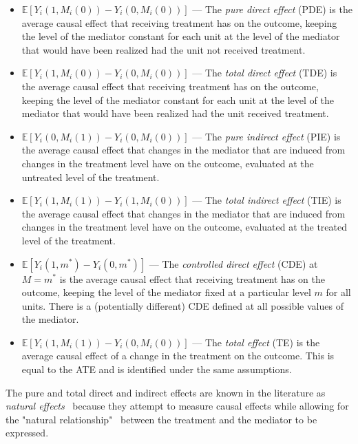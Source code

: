 \begin{itemize}[noitemsep,topsep=0pt]
	\item $\mathbb{E}[Y_{i}(1,M_{i}(0)) - Y_{i}(0,M_{i}(0))]$ --- The \textit{pure direct effect} (PDE)
	is the average causal effect that receiving treatment has on the outcome, keeping the level of the mediator constant 
	for each unit at the level of the mediator that would have been realized had the unit not received treatment. 
	\item $\mathbb{E}[Y_{i}(1,M_{i}(0)) - Y_{i}(0,M_{i}(0))]$ --- The \textit{total direct effect} (TDE)
	is the average causal effect that receiving treatment has on the outcome, keeping the level of the mediator constant 
	for each unit at the level of the mediator that would have been realized had the unit received treatment. 
	\item $\mathbb{E}[Y_{i}(0,M_{i}(1)) - Y_{i}(0,M_{i}(0))]$ --- The \textit{pure indirect effect} (PIE)
	is the average causal effect that changes in the mediator that are induced from changes in the treatment level have
	on the outcome, evaluated at the untreated level of the treatment.  
	\item $\mathbb{E}[Y_{i}(1,M_{i}(1)) - Y_{i}(1,M_{i}(0))]$ --- The \textit{total indirect effect} (TIE)
	is the average causal effect that changes in the mediator that are induced from changes in the treatment level have
	on the outcome, evaluated at the treated level of the treatment.  
	\item $\mathbb{E}[Y_{i}(1,m^{*}) - Y_{i}(0,m^{*})]$ --- The \textit{controlled direct effect} (CDE) at $M=m^{*}$ is the 
	average causal effect that receiving treatment has on the outcome, keeping the level of the mediator fixed at a 
	particular level $m$ for all units. There is a (potentially different) CDE defined at all possible values of the 
	mediator. 
	\item $\mathbb{E}[Y_{i}(1,M_{i}(1)) - Y_{i}(0,M_{i}(0))]$ --- The \textit{total effect} (TE) is 
	the average causal effect of a change in the treatment on the outcome. This is equal to the ATE and is identified
	under the same assumptions. 
\end{itemize}

The pure and total direct and indirect effects are known in the literature as 
\textit{natural effects}~\citep{robinsgreenland1992,pearl2001} because 
they attempt to measure causal effects while allowing for the "natural relationship"~\citep{pearl2001} between the treatment 
and the mediator to be expressed.

